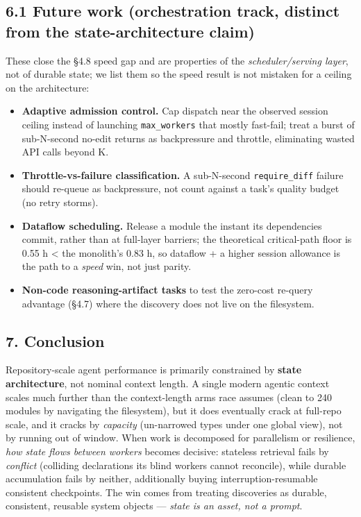 \documentclass[
  10pt,
]{article}
\providecommand{\tightlist}{%
  \setlength{\itemsep}{0pt}\setlength{\parskip}{0pt}}
\begin{document}
\subsection{6.1 Future work (orchestration track, distinct from the
state-architecture
claim)}\label{future-work-orchestration-track-distinct-from-the-state-architecture-claim}

These close the §4.8 speed gap and are properties of the
\emph{scheduler/serving layer}, not of durable state; we list them so
the speed result is not mistaken for a ceiling on the architecture:

\begin{itemize}
\tightlist
\item
  \textbf{Adaptive admission control.} Cap dispatch near the observed
  session ceiling instead of launching \texttt{max\_workers} that mostly
  fast-fail; treat a burst of sub-N-second no-edit returns as
  backpressure and throttle, eliminating wasted API calls beyond K.
\item
  \textbf{Throttle-vs-failure classification.} A sub-N-second
  \texttt{require\_diff} failure should re-queue as backpressure, not
  count against a task's quality budget (no retry storms).
\item
  \textbf{Dataflow scheduling.} Release a module the instant its
  dependencies commit, rather than at full-layer barriers; the
  theoretical critical-path floor is 0.55 h \textless{} the monolith's
  0.83 h, so dataflow + a higher session allowance is the path to a
  \emph{speed} win, not just parity.
\item
  \textbf{Non-code reasoning-artifact tasks} to test the zero-cost
  re-query advantage (§4.7) where the discovery does not live on the
  filesystem.
\end{itemize}

\subsection{7. Conclusion}\label{conclusion}

Repository-scale agent performance is primarily constrained by
\textbf{state architecture}, not nominal context length. A single modern
agentic context scales much further than the context-length arms race
assumes (clean to 240 modules by navigating the filesystem), but it does
eventually crack at full-repo scale, and it cracks by \emph{capacity}
(un-narrowed types under one global view), not by running out of window.
When work is decomposed for parallelism or resilience, \emph{how state
flows between workers} becomes decisive: stateless retrieval fails by
\emph{conflict} (colliding declarations its blind workers cannot
reconcile), while durable accumulation fails by neither, additionally
buying interruption-resumable consistent checkpoints. The win comes from
treating discoveries as durable, consistent, reusable system objects ---
\emph{state is an asset, not a prompt}.
\end{document}
